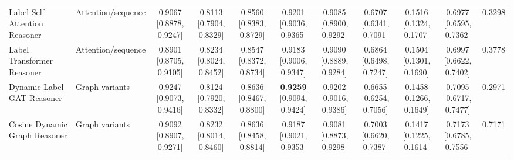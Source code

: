 \documentclass[Afour,sagev,times]{sagej}
\begin{document}
\begin{table}[h]
{\begin{tabular}{ll*{9}{c}}
Label Self-Attention Reasoner & Attention/sequence & \shortstack{0.9067\\{[}0.8878, 0.9247{]}} & \shortstack{0.8113\\{[}0.7904, 0.8329{]}} & \shortstack{0.8560\\{[}0.8383, 0.8729{]}} & \shortstack{0.9201\\{[}0.9036, 0.9365{]}} & \shortstack{0.9085\\{[}0.8900, 0.9292{]}} & \shortstack{0.6707\\{[}0.6341, 0.7091{]}} & \shortstack{0.1516\\{[}0.1324, 0.1707{]}} & \shortstack{0.6977\\{[}0.6595, 0.7362{]}} & 0.3298 \\
Label Transformer Reasoner & Attention/sequence & \shortstack{0.8901\\{[}0.8705, 0.9105{]}} & \shortstack{0.8234\\{[}0.8024, 0.8452{]}} & \shortstack{0.8547\\{[}0.8372, 0.8734{]}} & \shortstack{0.9183\\{[}0.9006, 0.9347{]}} & \shortstack{0.9090\\{[}0.8889, 0.9284{]}} & \shortstack{0.6864\\{[}0.6498, 0.7247{]}} & \shortstack{0.1504\\{[}0.1301, 0.1690{]}} & \shortstack{0.6997\\{[}0.6622, 0.7402{]}} & 0.3778 \\
Dynamic Label GAT Reasoner & Graph variants & \shortstack{0.9247\\{[}0.9073, 0.9416{]}} & \shortstack{0.8124\\{[}0.7920, 0.8332{]}} & \shortstack{0.8636\\{[}0.8467, 0.8800{]}} & \shortstack{\textbf{0.9259}\\{[}0.9094, 0.9424{]}} & \shortstack{0.9202\\{[}0.9016, 0.9386{]}} & \shortstack{0.6655\\{[}0.6254, 0.7056{]}} & \shortstack{0.1458\\{[}0.1266, 0.1649{]}} & \shortstack{0.7095\\{[}0.6717, 0.7477{]}} & 0.2971 \\
Cosine Dynamic Graph Reasoner & Graph variants & \shortstack{0.9092\\{[}0.8907, 0.9271{]}} & \shortstack{0.8232\\{[}0.8014, 0.8460{]}} & \shortstack{0.8636\\{[}0.8458, 0.8814{]}} & \shortstack{0.9187\\{[}0.9021, 0.9353{]}} & \shortstack{0.9081\\{[}0.8873, 0.9298{]}} & \shortstack{0.7003\\{[}0.6620, 0.7387{]}} & \shortstack{0.1417\\{[}0.1225, 0.1614{]}} & \shortstack{0.7173\\{[}0.6785, 0.7556{]}} & 0.7171 \\

\end{tabular}}
\end{table}
\end{document}
